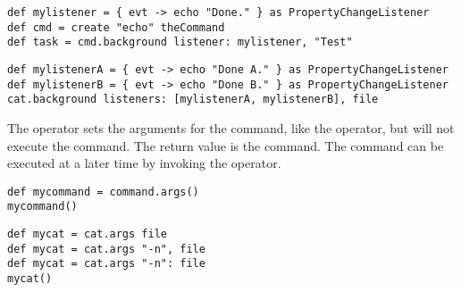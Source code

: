 \begin{lstlisting}[style=Groovybash, label={lst:example_background2}, 
title={Inform when the command finishes in the background.}]
def mylistener = { evt -> echo "Done." } as PropertyChangeListener
def cmd = create "echo" theCommand
def task = cmd.background listener: mylistener, "Test"
\end{lstlisting}

\begin{lstlisting}[style=Groovybash, label={lst:example_background2}, 
title={Inform the listeners when the command finishes in the background.}]
def mylistenerA = { evt -> echo "Done A." } as PropertyChangeListener
def mylistenerB = { evt -> echo "Done B." } as PropertyChangeListener
cat.background listeners: [mylistenerA, mylistenerB], file
\end{lstlisting}

\pagebreak
{}%

The  operator sets the arguments for the command, like 
the  operator, but will not execute the command. The return
value is the command. The command can be executed at a later time by invoking
the  operator.

\begin{lstlisting}[style=Groovybash, label={lst:example_args1}, title={Store 
the command in a variable with no arguments given.}]
def mycommand = command.args()
mycommand()
\end{lstlisting}

\begin{lstlisting}[style=Groovybash, label={lst:example_args2}, title={Store 
the command in a variable with arguments given either direct or by key=value 
pairs.}]
def mycat = cat.args file
def mycat = cat.args "-n", file
def mycat = cat.args "-n": file
mycat()
\end{lstlisting}

